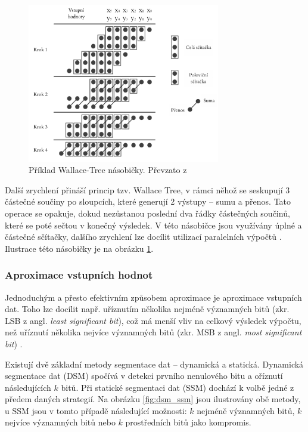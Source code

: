 \begin{figure}[H]
    \centering
    \includegraphics[width=0.75\textwidth]{obrazky-figures/wallacetree.png}
    \caption{Příklad Wallace-Tree násobičky. Převzato z \cite{approx_mult_survey}}
    \label{fig:wallacetree}
\end{figure}

Další zrychlení přináší princip tzv. Wallace Tree, v rámci něhož se seskupují 3 částečné součiny po sloupcích, které generují 2 výstupy -- sumu a přenos. Tato operace se opakuje, dokud nezůstanou poslední dva řádky částečných součinů, které se poté sečtou v konečný výsledek. V této násobičce jsou využívány úplné a částečné sčítačky, dalšího zrychlení lze docílit utilizací paralelních výpočtů \cite{wallace_tree}. Ilustrace této násobičky je na obrázku \ref{fig:wallacetree}.

\subsubsection{Aproximace vstupních hodnot}
Jednoduchým a přesto efektivním způsobem aproximace je aproximace vstupních dat. Toho lze docílit např. uříznutím několika nejméně významných bitů (zkr. LSB z angl. \textit{least significant bit}), což má menší vliv na celkový výsledek výpočtu, než uříznutí několika nejvíce významných bitů (zkr. MSB z angl. \textit{most significant bit}) \cite{approx_mult_survey}. 

Existují dvě základní metody segmentace dat -- dynamická a statická. Dynamická segmentace dat (DSM) spočívá v detekci prvního nenulového bitu a oříznutí následujících $k$ bitů. Při statické segmentaci dat (SSM) dochází k volbě jedné z předem daných strategií. Na obrázku \ref{fig:dsm_ssm} jsou ilustrovány obě metody, u SSM jsou v tomto případě následující možnosti: $k$ nejméně významných bitů, $k$ nejvíce významných bitů nebo $k$ prostředních bitů jako kompromis.

